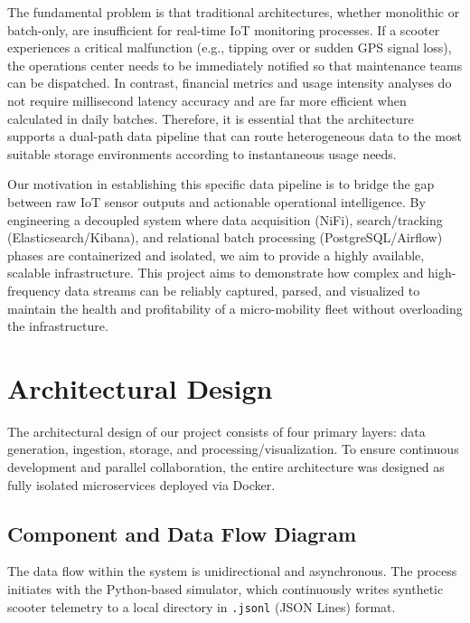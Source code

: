 \documentclass[conference]{IEEEtran}
\begin{document}
The fundamental problem is that traditional architectures, whether monolithic or batch-only, are insufficient for real-time IoT monitoring processes. If a scooter experiences a critical malfunction (e.g., tipping over or sudden GPS signal loss), the operations center needs to be immediately notified so that maintenance teams can be dispatched. In contrast, financial metrics and usage intensity analyses do not require millisecond latency accuracy and are far more efficient when calculated in daily batches. Therefore, it is essential that the architecture supports a dual-path data pipeline that can route heterogeneous data to the most suitable storage environments according to instantaneous usage needs.

Our motivation in establishing this specific data pipeline is to bridge the gap between raw IoT sensor outputs and actionable operational intelligence. By engineering a decoupled system where data acquisition (NiFi), search/tracking (Elasticsearch/Kibana), and relational batch processing (PostgreSQL/Airflow) phases are containerized and isolated, we aim to provide a highly available, scalable infrastructure. This project aims to demonstrate how complex and high-frequency data streams can be reliably captured, parsed, and visualized to maintain the health and profitability of a micro-mobility fleet without overloading the infrastructure.


\section{Architectural Design}

The architectural design of our project consists of four primary layers: data generation, ingestion, storage, and processing/visualization. To ensure continuous development and parallel collaboration, the entire architecture was designed as fully isolated microservices deployed via Docker.

\subsection{Component and Data Flow Diagram}
The data flow within the system is unidirectional and asynchronous. The process initiates with the Python-based simulator, which continuously writes synthetic scooter telemetry to a local directory in \texttt{.jsonl} (JSON Lines) format. 
\end{document}
